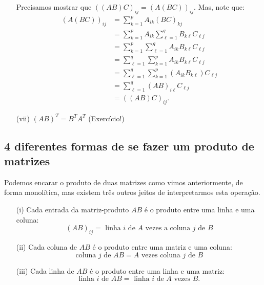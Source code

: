 \begin{itemize}
    Precisamos mostrar que $((AB)C)_{ij} = (A(BC))_{ij}$. Mas, note que:
    \begin{align*}
       (A(BC))_{ij} &= \sum_{k=1}^p A_{ik} (BC)_{kj}\\
       &= \sum_{k=1}^p A_{ik} \sum_{\ell=1}^q B_{k\ell} C_{\ell j}\\
       &= \sum_{k=1}^p \sum_{\ell=1}^q A_{ik} B_{k\ell} C_{\ell j}\\
       &= \sum_{\ell=1}^q \sum_{k=1}^p A_{ik} B_{k\ell} C_{\ell j}\\
       &= \sum_{\ell=1}^q \sum_{k=1}^p (A_{ik} B_{k\ell}) C_{\ell j}\\
       &= \sum_{\ell=1}^q (AB)_{i\ell} C_{\ell j}\\
       &= ((AB)C)_{ij}.
    \end{align*}
    \item[(vii)] $(AB)^T = B^T A^T$ (Exercício!)
\end{itemize}

\subsection{4 diferentes formas de se fazer um produto de matrizes}

Podemos encarar o produto de duas matrizes como vimos anteriormente, de forma monolítica, mas existem três outros jeitos de interpretarmos esta operação.

\begin{itemize}
    \item[(i)] Cada entrada da matriz-produto $AB$ é o produto entre uma linha e uma coluna:
    \begin{equation*}
        (AB)_{ij} = \mbox{ linha } i \mbox{ de } A \mbox{ vezes a coluna } j \mbox{ de } B
    \end{equation*}
    \item[(ii)] Cada coluna de $AB$ é o produto entre uma matriz e uma coluna:
    \begin{equation*}
        \mbox{coluna } j \mbox{ de } AB = A \mbox{ vezes coluna } j \mbox{ de } B
    \end{equation*}
    \item[(iii)] Cada linha de $AB$ é o produto entre uma linha e uma matriz:
    \begin{equation*}
        \mbox{linha } i \mbox{ de } AB = \mbox{ linha } i \mbox{ de } A \mbox{ vezes } B.
    \end{equation*}
\end{itemize}

